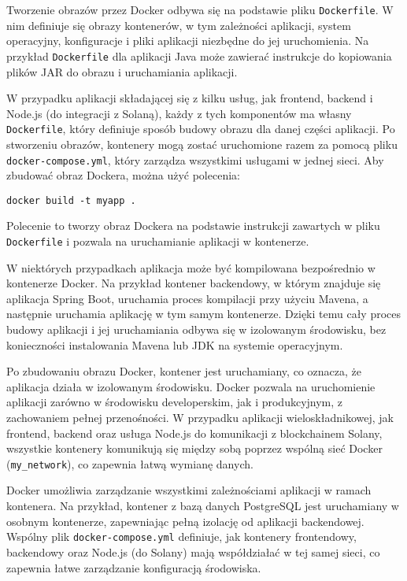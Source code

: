 Tworzenie obrazów przez Docker odbywa się na podstawie pliku \texttt{Dockerfile}. W nim definiuje się obrazy kontenerów, w tym zależności aplikacji, system operacyjny, konfiguracje i pliki aplikacji niezbędne do jej uruchomienia. Na przykład \texttt{Dockerfile} dla aplikacji Java może zawierać instrukcje do kopiowania plików JAR do obrazu i uruchamiania aplikacji.

 W przypadku aplikacji składającej się z kilku usług, jak frontend, backend i Node.js (do integracji z Solaną), każdy z tych komponentów ma własny \texttt{Dockerfile}, który definiuje sposób budowy obrazu dla danej części aplikacji. Po stworzeniu obrazów, kontenery mogą zostać uruchomione razem za pomocą pliku \texttt{docker-compose.yml}, który zarządza wszystkimi usługami w jednej sieci.
Aby zbudować obraz Dockera, można użyć polecenia:
\begin{lstlisting}
docker build -t myapp .
\end{lstlisting}
Polecenie to tworzy obraz Dockera na podstawie instrukcji zawartych w pliku \texttt{Dockerfile} i pozwala na uruchamianie aplikacji w kontenerze.


W niektórych przypadkach aplikacja może być kompilowana bezpośrednio w kontenerze Docker. Na przykład kontener backendowy, w którym znajduje się aplikacja Spring Boot, uruchamia proces kompilacji przy użyciu Mavena, a następnie uruchamia aplikację w tym samym kontenerze. Dzięki temu cały proces budowy aplikacji i jej uruchamiania odbywa się w izolowanym środowisku, bez konieczności instalowania Mavena lub JDK na systemie operacyjnym.
   
Po zbudowaniu obrazu Docker, kontener jest uruchamiany, co oznacza, że aplikacja działa w izolowanym środowisku. Docker pozwala na uruchomienie aplikacji zarówno w środowisku developerskim, jak i produkcyjnym, z zachowaniem pełnej przenośności. W przypadku aplikacji wieloskładnikowej, jak frontend, backend oraz usługa Node.js do komunikacji z blockchainem Solany, wszystkie kontenery komunikują się między sobą poprzez wspólną sieć Docker (\texttt{my\_network}), co zapewnia łatwą wymianę danych.
    
Docker umożliwia zarządzanie wszystkimi zależnościami aplikacji w ramach kontenera. Na przykład, kontener z bazą danych PostgreSQL jest uruchamiany w osobnym kontenerze, zapewniając pełną izolację od aplikacji backendowej. Wspólny plik \texttt{docker-compose.yml} definiuje, jak kontenery frontendowy, backendowy oraz Node.js (do Solany) mają współdziałać w tej samej sieci, co zapewnia łatwe zarządzanie konfiguracją środowiska.

